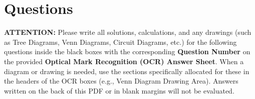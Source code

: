 \documentclass[12pt,a4paper]{article}
\begin{document}
\newpage

\section*{\textbf{\color{TitleColor}Questions}}

\noindent\colorbox{yellow!40}{%
    \parbox{\dimexpr\linewidth-2\fboxsep\relax}{%
        \textbf{ATTENTION:} Please write all solutions, calculations, and any drawings (such as Tree Diagrams, Venn Diagrams, Circuit Diagrams, etc.) for the following questions inside the black boxes with the corresponding \textbf{Question Number} on the provided \textbf{Optical Mark Recognition (OCR) Answer Sheet}. When a diagram or drawing is needed, use the sections specifically allocated for these in the headers of the OCR boxes ({\color{ChoiceColor}e.g., Venn Diagram Drawing Area}). Answers written on the back of this PDF or in blank margins will not be evaluated.
    }%
}
\vspace{0.5cm}
\end{document}
